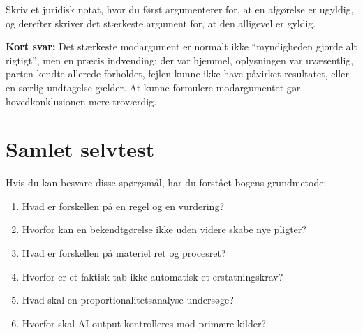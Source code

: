 Skriv et juridisk notat, hvor du først argumenterer for, at en afgørelse er ugyldig, og derefter skriver det stærkeste argument for, at den alligevel er gyldig.

\textbf{Kort svar:} Det stærkeste modargument er normalt ikke ``myndigheden gjorde alt rigtigt'', men en præcis indvending: der var hjemmel, oplysningen var uvæsentlig, parten kendte allerede forholdet, fejlen kunne ikke have påvirket resultatet, eller en særlig undtagelse gælder. At kunne formulere modargumentet gør hovedkonklusionen mere troværdig.

\section*{Samlet selvtest}

Hvis du kan besvare disse spørgsmål, har du forstået bogens grundmetode:
\begin{enumerate}
  \item Hvad er forskellen på en regel og en vurdering?
  \item Hvorfor kan en bekendtgørelse ikke uden videre skabe nye pligter?
  \item Hvad er forskellen på materiel ret og procesret?
  \item Hvorfor er et faktisk tab ikke automatisk et erstatningskrav?
  \item Hvad skal en proportionalitetsanalyse undersøge?
  \item Hvorfor skal AI-output kontrolleres mod primære kilder?
\end{enumerate}

